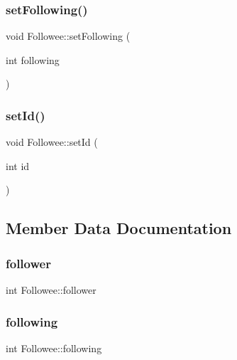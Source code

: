 \subsubsection{\texorpdfstring{set\+Following()}{setFollowing()}}
{\footnotesize\ttfamily void Followee\+::set\+Following (\begin{DoxyParamCaption}\item[{int}]{following }\end{DoxyParamCaption})}

\mbox{\label{class_followee_a21f7b67430875a872465c30ee99f0c16}} 
\subsubsection{\texorpdfstring{set\+Id()}{setId()}}
{\footnotesize\ttfamily void Followee\+::set\+Id (\begin{DoxyParamCaption}\item[{int}]{id }\end{DoxyParamCaption})}



\subsection{Member Data Documentation}
\mbox{\label{class_followee_aa94022443f6b3f3703ad9dc423b53582}} 
\subsubsection{\texorpdfstring{follower}{follower}}
{\footnotesize\ttfamily int Followee\+::follower\hspace{0.3cm}{\ttfamily [private]}}

\mbox{\label{class_followee_acb8bf9bcbdf308e143a354ffc42ea75b}} 
\subsubsection{\texorpdfstring{following}{following}}
{\footnotesize\ttfamily int Followee\+::following\hspace{0.3cm}{\ttfamily [private]}}

